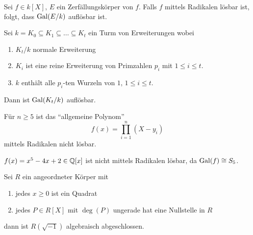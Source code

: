 \begin{theorem}
	Sei $f \in k[X]$, $E$ ein Zerfällungskörper von $f$. Falls $f$ mittels Radikalen lösbar ist, folgt, dass $\operatorname{Gal}(E / k)$ auflösbar ist.
\end{theorem}

\begin{lemma}
	Sei $k = K_0 \subseteq K_1 \subseteq \ldots \subseteq K_{t}$ ein Turm von Erweiterungen wobei
	\begin{enumerate}[(1)]
		\item $K_{t} / k$ normale Erweiterung
		\item $K_{i}$ ist eine reine Erweiterung von Primzahlen $p_{i}$ mit $1 \leq i \leq t$.
		\item $k$ enthält alle $p_{i}$-ten Wurzeln von $1$, $1 \leq i \leq t$.
	\end{enumerate}
	Dann ist $\operatorname{Gal}(K_{t} / k)$ auflösbar.
\end{lemma}



\begin{corollary}
	Für $n \geq 5$ ist das \enquote{allgemeine Polynom}
	\[
		f(x) = \prod_{i=1}^{n} (X-y_{i})
	\] 
	mittels Radikalen nicht lösbar.
\end{corollary}


\begin{corollary}
	$f(x) = x^{5} - 4x + 2 \in \mathbb{Q}[x]$ ist nicht mittels Radikalen lösbar, da $\operatorname{Gal}(f) \cong S_{5}$.
\end{corollary}

Sei $R$ ein angeordneter Körper mit
\begin{enumerate}
	\item jedes $x \geq 0$ ist ein Quadrat
	\item jedes $P \in R[X]$ mit  $\deg(P)$ ungerade hat eine Nullstelle in $R$
\end{enumerate}
dann ist $R(\sqrt{-1})$ algebraisch abgeschlossen.






























